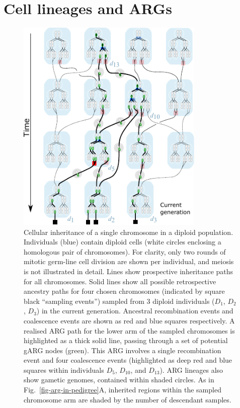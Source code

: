 \documentclass[9pt,twocolumn,twoside]{gsajnl}
\begin{document}
\section{Cell lineages and ARGs}
\label{sec-cell-lineages-and-args}
\begin{figure}
\begin{center}
    \includegraphics[width=0.8\textwidth]{illustrations/cell-lines}
\end{center}
\caption{\label{fig-cell-lines}
Cellular inheritance of a single chromosome in a diploid population.
Individuals (blue) contain diploid cells (white circles enclosing a homologous pair of chromosomes).
For clarity, only two rounds of mitotic germ-line cell division are shown per individual, and
meiosis is not illustrated in detail.
Lines show prospective inheritance paths for all chromosomes. Solid lines show all possible
retrospective ancestry paths for four chosen chromosomes (indicated by square black ``sampling events'')
sampled from 3 diploid individuals ($D_1$, $D_2$, $D_3$) in the current generation.
Ancestral recombination events and coalescence events are shown as red and blue squares respectively.
A realised ARG path for the lower arm of the sampled chromosomes is highlighted as a
thick solid line, passing through a set of potential gARG nodes (green). This ARG
involves a single recombination event and four coalescence events
(highlighted as deep red and blue squares within individuals $D_5$, $D_{10}$, and $D_{13}$).
ARG lineages also show gametic genomes, contained within shaded circles.
As in Fig.~\ref{fig-arg-in-pedigree}A, inherited regions within the sampled chromosome arm are
shaded by the number of descendant samples.
}
\end{figure}
\end{document}
